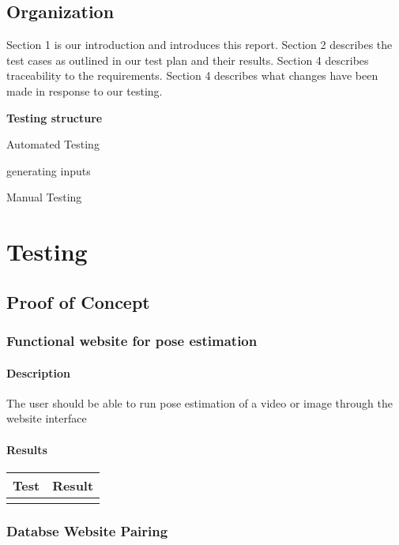 \documentclass{scrreprt}
\begin{document}
\section{Organization}
    Section 1 is our introduction and introduces this report. Section 2 describes the test cases as outlined in our test plan and their results. Section 4 describes traceability to the requirements. Section 4 describes what changes have been made in response to our testing.

    \textbf{Testing structure}

    Automated Testing

    \quad generating inputs

    Manual Testing

\chapter{Testing}

\section{Proof of Concept}
\subsection{Functional website for pose estimation}
\subsubsection{Description}
The user should be able to run pose estimation of a video or image through the website interface
\subsubsection{Results}
 \centering
 \begin{tabular}{||p{2.5cm}|p{2.5cm}||}
 \hline
 \bf Test & \bf Result\\
 \hline\hline
   &  \\ %
 \hline
 \end{tabular}

\subsection{Databse Website Pairing}
\end{document}
